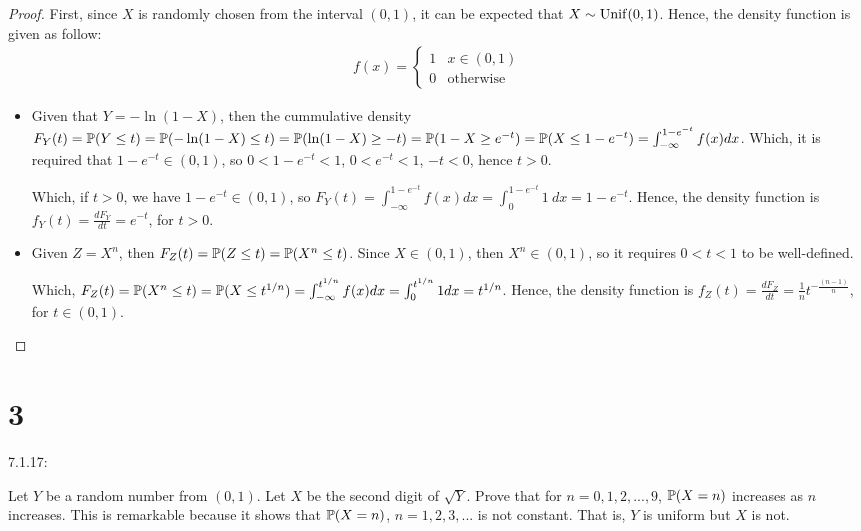 \documentclass{article}
\begin{document}
\begin{proof}

    First, since $X$ is randomly chosen from the interval $(0,1)$, it can be expected that $X \sim \mathrm{Unif}(0,1)$. Hence, the density function is given as follow:
    \begin{align}
        f(x)=\begin{cases}
            1 & x\in(0,1)\\
            0 & \text{otherwise}
        \end{cases}
    \end{align} 

    \begin{itemize}
        \item[(a)] Given that $Y=-\ln(1-X)$, then the cummulative density $F_Y(t)=\mathbb{P}(Y\leq t)=\mathbb{P}(-\ln(1-X)\leq t)=\mathbb{P}(\ln(1-X)\geq -t)=\mathbb{P}(1-X\geq e^{-t}) = \mathbb{P}(X\leq 1-e^{-t}) = \int_{-\infty}^{1-e^{-t}}f(x)dx$. Which, it is required that $1-e^{-t}\in (0,1)$, so $0<1-e^{-t}<1$, $0<e^{-t}<1$, $-t<0$, hence $t>0$.
        
        Which, if $t>0$, we have $1-e^{-t}\in (0,1)$, so $F_Y(t) = \int_{-\infty}^{1-e^{-t}}f(x)dx = \int_{0}^{1-e^{-t}}1\  dx = 1-e^{-t}$. Hence, the density function is $f_Y(t) = \frac{dF_Y}{dt} = e^{-t}$, for $t>0$.

        \hfil

        \item[(b)] Given $Z=X^n$, then $F_Z(t) = \mathbb{P}(Z\leq t)=\mathbb{P}(X^n\leq t)$. Since $X\in (0,1)$, then $X^n\in(0,1)$, so it requires $0<t<1$ to be well-defined.
        
        Which, $F_Z(t) = \mathbb{P}(X^n\leq t) = \mathbb{P}(X\leq t^{1/n}) = \int_{-\infty}^{t^{1/n}}f(x)dx = \int_{0}^{t^{1/n}}1 dx = t^{1/n}$. Hence, the density function is $f_Z(t) = \frac{dF_Z}{dt} = \frac{1}{n}t^{-\frac{(n-1)}{n}}$, for $t\in (0,1)$.
    \end{itemize}
\end{proof}

\newpage

\section*{3}
\begin{ques}\label{q3}
    7.1.17:

    Let $Y$ be a random number from $(0,1)$. Let $X$ be the second digit of $\sqrt{Y}$. Prove that for $n=0,1,2,...,9$, $\mathbb{P}(X=n)$ increases as $n$ increases. This is remarkable because it shows that $\mathbb{P}(X=n)$, $n=1,2,3,...$ is not constant. That is, $Y$ is uniform but $X$ is not.
\end{ques}
\end{document}
